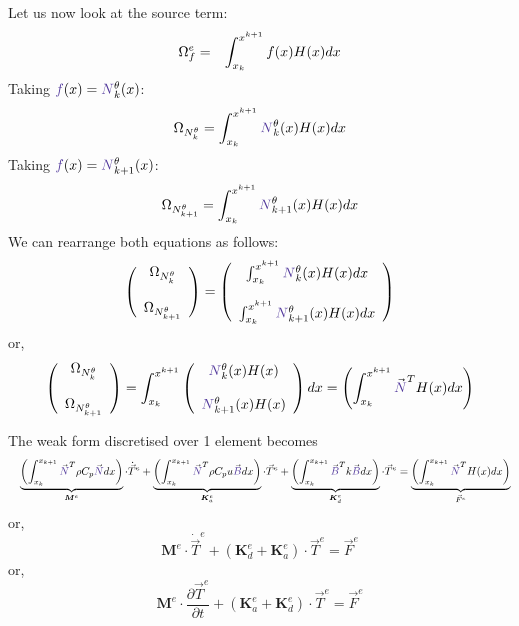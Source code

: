 Let us now look at the source term:
\begin{eqnarray}
{\Omega}_f^e &=&
\int_{x_k}^{x^{k+1}} f(x) H(x) dx \nonumber
\end{eqnarray}
Taking ${\color{Violet}f}(x)={\color{Violet}N}_k^\theta(x)$: 
\[
{\Omega}_{N_k^\theta}=
\int_{x_k}^{x^{k+1}} {\color{Violet}N}_k^\theta(x) H(x) dx \nn
\]
Taking ${\color{Violet}f}(x)={\color{Violet}N}_{k+1}^\theta(x)$: 
\[
{\Omega}_{N_{k+1}^\theta}=
\int_{x_k}^{x^{k+1}} {\color{Violet}N}_{k+1}^\theta(x) H(x) dx \nn
\]
We can rearrange both equations as follows:
\[
\left(
\begin{array}{cc}
 {\Omega}_{N_k^\theta} \\ \\ {\Omega}_{N_{k+1}^\theta}
\end{array}
\right)
=
\left(
\begin{array}{cc}
\int_{x_k}^{x^{k+1}} {\color{Violet}N}_k^\theta(x) H(x) dx \nn \\ \\ 
\int_{x_k}^{x^{k+1}} {\color{Violet}N}_{k+1}^\theta(x) H(x) dx \nn
\end{array}
\right)
\]
or,
\[
\left(
\begin{array}{cc}
 {\Omega}_{N_k^\theta} \\ \\ {\Omega}_{N_{k+1}^\theta}
\end{array}
\right)
=
\int_{x_k}^{x^{k+1}}
\left(
\begin{array}{cc}
{\color{Violet}N}_k^\theta(x)  H(x)  \nn \\ \\ 
{\color{Violet}N}_{k+1}^\theta(x) H(x)  \nn
\end{array}
\right)
dx
=
\left(
\int_{x_k}^{x^{k+1}}
{\vec {\color{Violet}N}}^T H(x) dx
\right)
\]


The weak form discretised over 1 element becomes
\begin{eqnarray}
&&\underbrace{\left( \int_{x_k}^{x_{k+1}}   {\vec {\color{Violet}N}}^T \rho C_p {\vec {\color{Violet}N}} dx  \right) }_{\bm M^e} \cdot \dot{\vec T}^e
+
\underbrace{\left( \int_{x_k}^{x_{k+1}}   {\vec {\color{Violet}N}}^T \rho C_p u {\vec {\color{Violet}B}} dx  \right)}_{{\bm K}_a^e} \cdot {\vec T}^e 
 +
\underbrace{\left( \int_{x_k}^{x_{k+1}}   {\vec {\color{Violet}B}}^T k {\vec {\color{Violet}B}} dx  \right)}_{{\bm K}_d^e} \cdot {\vec T}^e 
=
\underbrace{\left( \int_{x_k}^{x_{k+1}}   {\vec {\color{Violet}N}}^T H(x) dx \right)}_{{\vec F}^e} \nn 
\end{eqnarray}
or,
\[
\boxed{
{\bm M}^e \cdot \dot{\vec T}^e + ({\bm K}_d^e + {\bm K}_a^e)\cdot {\vec T}^e = {\vec F}^e
}
\]
or,
\[
\boxed{
{\bm M}^e \cdot \frac{\partial {\vec T}^e}{\partial t} + ({\bm K}_a^e + {\bm K}_d^e) \cdot {\vec T}^e = {\vec F}^e
}
\]

